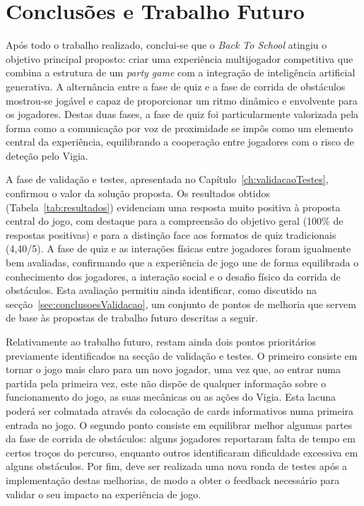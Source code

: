 \chapter{Conclusões e Trabalho Futuro}
\label{ch:conclusoesTrabalhoFuturo}

Após todo o trabalho realizado, conclui-se que o \textit{Back To School} atingiu o objetivo principal proposto: criar uma experiência multijogador competitiva que combina a estrutura de um \textit{party game} com a integração de inteligência artificial generativa. A alternância entre a fase de quiz e a fase de corrida de obstáculos mostrou-se jogável e capaz de proporcionar um ritmo dinâmico e envolvente para os jogadores. Destas duas fases, a fase de quiz foi particularmente valorizada pela forma como a comunicação por voz de proximidade se impôs como um elemento central da experiência, equilibrando a cooperação entre jogadores com o risco de deteção pelo Vigia.

A fase de validação e testes, apresentada no Capítulo~\ref{ch:validacaoTestes}, confirmou o valor da solução proposta. Os resultados obtidos (Tabela~\ref{tab:resultados}) evidenciam uma resposta muito positiva à proposta central do jogo, com destaque para a compreensão do objetivo geral (100\% de respostas positivas) e para a distinção face aos formatos de quiz tradicionais (4,40/5). A fase de quiz e as interações físicas entre jogadores foram igualmente bem avaliadas, confirmando que a experiência de jogo une de forma equilibrada o conhecimento dos jogadores, a interação social e o desafio físico da corrida de obstáculos. Esta avaliação permitiu ainda identificar, como discutido na secção~\ref{sec:conclusoesValidacao}, um conjunto de pontos de melhoria que servem de base às propostas de trabalho futuro descritas a seguir.

Relativamente ao trabalho futuro, restam ainda dois pontos prioritários previamente identificados na secção de validação e testes. O primeiro consiste em tornar o jogo mais claro para um novo jogador, uma vez que, ao entrar numa partida pela primeira vez, este não dispõe de qualquer informação sobre o funcionamento do jogo, as suas mecânicas ou as ações do Vigia. Esta lacuna poderá ser colmatada através da colocação de cards informativos numa primeira entrada no jogo. O segundo ponto consiste em equilibrar melhor algumas partes da fase de corrida de obstáculos: alguns jogadores reportaram falta de tempo em certos troços do percurso, enquanto outros identificaram dificuldade excessiva em alguns obstáculos. Por fim, deve ser realizada uma nova ronda de testes após a implementação destas melhorias, de modo a obter o feedback necessário para validar o seu impacto na experiência de jogo.
